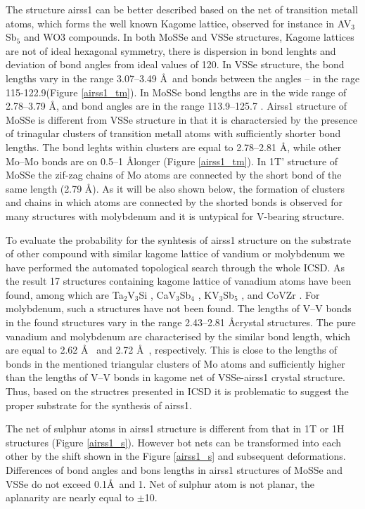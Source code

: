 \documentclass[a4paperm]{article}
\begin{document}
The structure airss1 can be better described based on the net of transition metall atoms, which forms the well known Kagome lattice\cite{zhang2021_kagome}, observed for instance in AV$_3$Sb$_5$ \cite{ortiz2021} and WO3 \cite{gerand1979} compounds.
In both MoSSe and VSSe structures, Kagome lattices are not of ideal hexagonal symmetry, there is dispersion in bond lenghts and deviation of bond angles from ideal values of 120\textdegree.
In VSSe  structure, the bond lengths vary in the range 3.07--3.49 \AA\ and bonds between the angles – in the rage 115-122.9\textdegree (Figure \ref{airss1_tm}).
In MoSSe bond lengths are in the wide range of 2.78--3.79 \AA, and bond angles are in the range 113.9--125.7 \textdegree.
Airss1 structure of MoSSe is different from VSSe structure in that it is charactersied by the presence of trinagular clusters of transition metall atoms with sufficiently shorter bond lengths.
The bond leghts within clusters are equal to 2.78--2.81 \AA, while other Mo--Mo bonds are on 0.5--1 \AA longer (Figure \ref{airss1_tm}).
In 1T' structure of MoSSe the zif-zag chains of Mo atoms are connected by the short bond of the same length (2.79 \AA).
As it will be also shown below, the formation of clusters and chains in which atoms are connected by the shorted bonds is observed for many structures with molybdenum and it is untypical for V-bearing structure.

To evaluate the probability for the synhtesis of airss1 structure on the substrate of other compound with similar kagome lattice of vandium or molybdenum we have performed the automated topological search through the whole ICSD.
As the result 17 structures containing kagome lattice of vanadium atoms have been found, among which are Ta$_2$V$_3$Si \cite{Ta2V3Si}, CaV$_3$Sb$_4$ \cite{ CaV3Sb4}, KV$_3$Sb$_5$ \cite{KV3Sb5}, and CoVZr \cite{ZrVCO}.
For molybdenum, such a structures have not been found.
The lengths of V--V bonds in the found structures vary in the range 2.43--2.81 \AA  crystal structures.
The pure vanadium and molybdenum are characterised by the similar bond length, which are equal to 2.62 \AA\ \cite{vanadium} and 2.72 \AA\ \cite{molybdenum}, respectively.
This is close to the lengths of bonds in the mentioned triangular clusters of Mo atoms and sufficiently higher than the lengths of V--V bonds in kagome net of VSSe-airss1 crystal structure.
Thus, based on the structres presented in ICSD it is problematic to suggest the proper substrate for the synthesis of airss1.


The net of sulphur atoms in airss1 structure is different from that in 1T or 1H structures (Figure \ref{airss1_s}).
However bot nets can be transformed into each other by the shift shown in the Figure \ref{airss1_s} and subsequent deformations.
Differences of bond angles and bons lengths in airss1 structures of MoSSe and VSSe do not exceed 0.1\AA\ and 1\textdegree.
Net of sulphur atom is not planar, the aplanarity are nearly equal to $\pm$10\textdegree.
\end{document}
